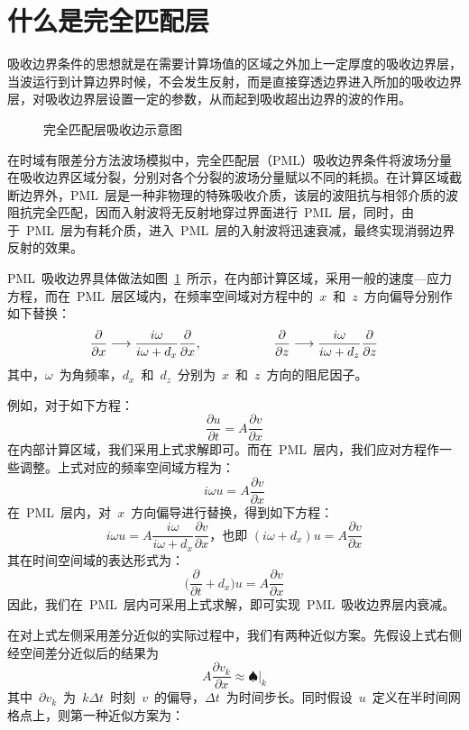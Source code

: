 \documentclass[UTF8]{ctexart}
\begin{document}
\section{什么是完全匹配层}
吸收边界条件的思想就是在需要计算场值的区域之外加上一定厚度的吸收边界层，当波运行到计算边界时候，不会发生反射，而是直接穿透边界进入所加的吸收边界层，对吸收边界层设置一定的参数，从而起到吸收超出边界的波的作用。\par
\begin{figure}[h]
  \centering
  
  \caption{完全匹配层吸收边示意图}\label{fig:pml}
\end{figure}
在时域有限差分方法波场模拟中，完全匹配层（PML）吸收边界条件将波场分量在吸收边界区域分裂，分别对各个分裂的波场分量赋以不同的耗损。在计算区域截断边界外，PML~层是一种非物理的特殊吸收介质，该层的波阻抗与相邻介质的波阻抗完全匹配，因而入射波将无反射地穿过界面进行~PML~层，同时，由于~PML~层为有耗介质，进入~PML~层的入射波将迅速衰减，最终实现消弱边界反射的效果。\par
PML~吸收边界具体做法如图~\ref{fig:pml}~所示，在内部计算区域，采用一般的速度—应力方程，而在~PML~层区域内，在频率空间域对方程中的~$x$~和~$z$~方向偏导分别作如下替换：
\[ \frac{\partial}{\partial x}\longrightarrow\frac{i\omega}{i\omega+d_x}\frac{\partial}{\partial x},\hspace{20mm} \frac{\partial}{\partial z}\longrightarrow\frac{i\omega}{i\omega+d_z}\frac{\partial}{\partial z} \]
其中，$\omega$~为角频率，$d_x$~和~$d_z$~分别为~$x$~和~$z$~方向的阻尼因子。\par
例如，对于如下方程：
\[ \frac{\partial u}{\partial t}=A\frac{\partial v}{\partial x} \]
在内部计算区域，我们采用上式求解即可。而在~PML~层内，我们应对方程作一些调整。上式对应的频率空间域方程为：
\[ i\omega u=A\frac{\partial v}{\partial x} \]
在~PML~层内，对~$x$~方向偏导进行替换，得到如下方程：
\[ i\omega u=A\frac{i\omega}{i\omega+d_x}\frac{\partial v}{\partial x} \text{，也即~} (i\omega+d_x)u=A\frac{\partial v}{\partial x} \]
其在时间空间域的表达形式为：
\begin{equation}\label{eq:dpml}
\Big(\frac{\partial}{\partial t}+d_x\Big)u=A\frac{\partial v}{\partial x}
\end{equation}
因此，我们在~PML~层内可采用上式求解，即可实现~PML~吸收边界层内衰减。\par
在对上式左侧采用差分近似的实际过程中，我们有两种近似方案。先假设上式右侧经空间差分近似后的结果为
\[ A\dfrac{\partial v_k}{\partial x}\approx\spadesuit|_k \]
其中~$\partial v_k$~为~$k\Delta t$~时刻~$v$~的偏导，$\Delta t$~为时间步长。同时假设~$u$~定义在半时间网格点上，则第一种近似方案为：
\end{document}
